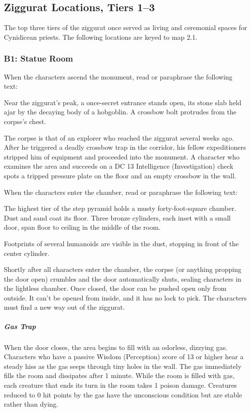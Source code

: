 \documentclass[10pt,a4paper,twoside,bg=print,twocolumn,openany,nodeprecatedcode]{dndbook}
\begin{document}
\subsection{Ziggurat Locations, Tiers 1–3}
The top three tiers of the ziggurat once served as living and ceremonial spaces for Cynidicean priests. The following locations are keyed to map 2.1.

\subsubsection{B1: Statue Room}
When the characters ascend the monument, read or paraphrase the following text:

\begin{DndReadAloud}{}
Near the ziggurat's peak, a once-secret entrance stands open, its stone slab held ajar by the decaying body of a hobgoblin. A crossbow bolt protrudes from the corpse's chest.

\end{DndReadAloud}

The corpse is that of an explorer who reached the ziggurat several weeks ago. After he triggered a deadly crossbow trap in the corridor, his fellow expeditioners stripped him of equipment and proceeded into the monument. A character who examines the area and succeeds on a DC 13 Intelligence (Investigation) check spots a tripped pressure plate on the floor and an empty crossbow in the wall.

When the characters enter the chamber, read or paraphrase the following text:

\begin{DndReadAloud}{}
The highest tier of the step pyramid holds a musty forty-foot-square chamber. Dust and sand coat its floor. Three bronze cylinders, each inset with a small door, span floor to ceiling in the middle of the room.

\end{DndReadAloud}

Footprints of several humanoids are visible in the dust, stopping in front of the center cylinder.

Shortly after all characters enter the chamber, the corpse (or anything propping the door open) crumbles and the door automatically shuts, sealing characters in the lightless chamber. Once closed, the door can be pushed open only from outside. It can't be opened from inside, and it has no lock to pick. The characters must find a new way out of the ziggurat.

\subparagraph{Gas Trap}
When the door closes, the area begins to fill with an odorless, dizzying gas. Characters who have a passive Wisdom (Perception) score of 13 or higher hear a steady hiss as the gas seeps through tiny holes in the wall. The gas immediately fills the room and dissipates after 1 minute. While the room is filled with gas, each creature that ends its turn in the room takes 1 poison damage. Creatures reduced to 0 hit points by the gas have the unconscious condition but are stable rather than dying.
\end{document}

